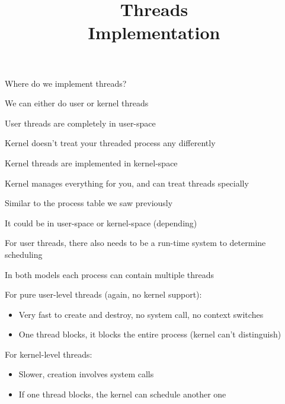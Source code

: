

\title{Threads\\Implementation}



  \begin{frame}
    \titlepage
  \end{frame}

  \begin{slide}


    Where do we implement threads?

    \leftspace{}We can either do user or kernel threads
    \medskip

    User threads are completely in user-space

    \leftspace{}Kernel doesn't treat your threaded process any differently
    \medskip

    Kernel threads are implemented in kernel-space

    \leftspace{}Kernel manages everything for you, and can treat threads specially

  \end{slide}

  \begin{slide}

    Similar to the process table we saw previously
    
    \leftspace{}It could be in user-space or kernel-space (depending)
    \medskip

    For user threads, there also needs to be a run-time system to determine
    scheduling
    \medskip

    In both models each process can contain multiple threads

  \end{slide}

  \begin{slide}


    For pure user-level threads (again, no kernel support):

    \begin{itemize}
      \item Very fast to create and destroy, no system call, no context switches
      \item One thread blocks, it blocks the entire process (kernel can't distinguish)
    \end{itemize}
    \medskip

    For kernel-level threads:

    \begin{itemize}
      \item Slower, creation involves system calls
      \item If one thread blocks, the kernel can schedule another one
    \end{itemize}

  \end{slide}

